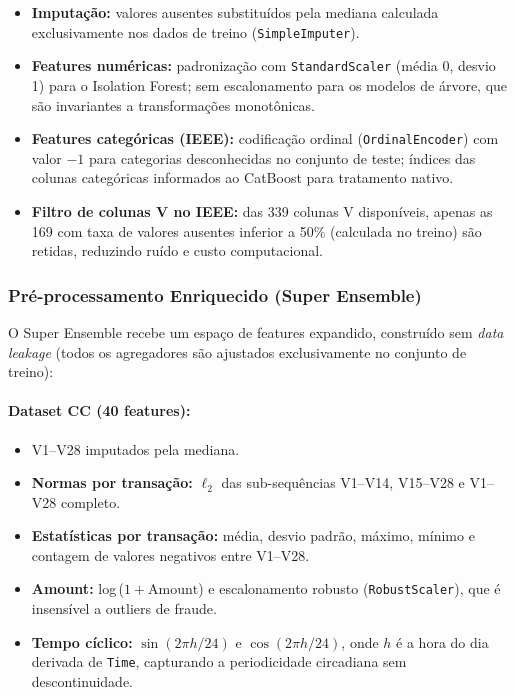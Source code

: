 \documentclass[12pt,a4paper]{article}
\begin{document}
\begin{itemize}[nosep]
  \item \textbf{Imputação:} valores ausentes substituídos pela mediana calculada
    exclusivamente nos dados de treino (\texttt{SimpleImputer}).
  \item \textbf{Features numéricas:} padronização com \texttt{StandardScaler}
    (média 0, desvio 1) para o Isolation Forest; sem escalonamento para os
    modelos de árvore, que são invariantes a transformações monotônicas.
  \item \textbf{Features categóricas (IEEE):} codificação ordinal
    (\texttt{OrdinalEncoder}) com valor $-1$ para categorias desconhecidas no
    conjunto de teste; índices das colunas categóricas informados ao CatBoost
    para tratamento nativo.
  \item \textbf{Filtro de colunas V no IEEE:} das 339 colunas V disponíveis,
    apenas as 169 com taxa de valores ausentes inferior a 50\% (calculada no
    treino) são retidas, reduzindo ruído e custo computacional.
\end{itemize}

\subsubsection{Pré-processamento Enriquecido (Super Ensemble)}

O Super Ensemble recebe um espaço de features expandido, construído sem
\textit{data leakage} (todos os agregadores são ajustados exclusivamente no
conjunto de treino):

\paragraph{Dataset CC (40 features):}
\begin{itemize}[nosep]
  \item V1--V28 imputados pela mediana.
  \item \textbf{Normas por transação:} $\ell_2$ das sub-sequências V1--V14,
    V15--V28 e V1--V28 completo.
  \item \textbf{Estatísticas por transação:} média, desvio padrão, máximo,
    mínimo e contagem de valores negativos entre V1--V28.
  \item \textbf{Amount:} log\,($1 + \text{Amount}$) e escalonamento robusto
    (\texttt{RobustScaler}), que é insensível a outliers de fraude.
  \item \textbf{Tempo cíclico:} $\sin(2\pi h/24)$ e $\cos(2\pi h/24)$, onde
    $h$ é a hora do dia derivada de \texttt{Time}, capturando a periodicidade
    circadiana sem descontinuidade.
\end{itemize}
\end{document}
